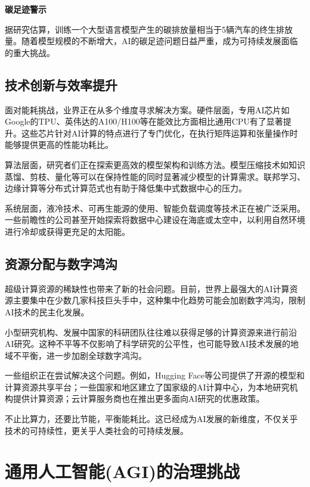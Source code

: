 \begin{center}
{\bf 碳足迹警示}

据研究估算，训练一个大型语言模型产生的碳排放量相当于5辆汽车的终生排放量。随着模型规模的不断增大，AI的碳足迹问题日益严重，成为可持续发展面临的重大挑战。
\end{center}

\subsection{技术创新与效率提升}

面对能耗挑战，业界正在从多个维度寻求解决方案。硬件层面，专用AI芯片如Google的TPU、英伟达的A100/H100等在能效比方面相比通用CPU有了显著提升。这些芯片针对AI计算的特点进行了专门优化，在执行矩阵运算和张量操作时能够提供更高的性能功耗比。

算法层面，研究者们正在探索更高效的模型架构和训练方法。模型压缩技术如知识蒸馏、剪枝、量化等可以在保持性能的同时显著减少模型的计算需求。联邦学习、边缘计算等分布式计算范式也有助于降低集中式数据中心的压力。

系统层面，液冷技术、可再生能源的使用、智能负载调度等技术正在被广泛采用。一些前瞻性的公司甚至开始探索将数据中心建设在海底或太空中，以利用自然环境进行冷却或获得更充足的太阳能。

\subsection{资源分配与数字鸿沟}

超级计算资源的稀缺性也带来了新的社会问题。目前，世界上最强大的AI计算资源主要集中在少数几家科技巨头手中，这种集中化趋势可能会加剧数字鸿沟，限制AI技术的民主化发展。

小型研究机构、发展中国家的科研团队往往难以获得足够的计算资源来进行前沿AI研究。这种不平等不仅影响了科学研究的公平性，也可能导致AI技术发展的地域不平衡，进一步加剧全球数字鸿沟。

一些组织正在尝试解决这个问题。例如，Hugging Face等公司提供了开源的模型和计算资源共享平台；一些国家和地区建立了国家级的AI计算中心，为本地研究机构提供计算资源；云计算服务商也在推出更多面向AI研究的优惠政策。

不止比算力，还要比节能，平衡能耗比。这已经成为AI发展的新维度，不仅关乎技术的可持续性，更关乎人类社会的可持续发展。

\section{通用人工智能(AGI)的治理挑战}

